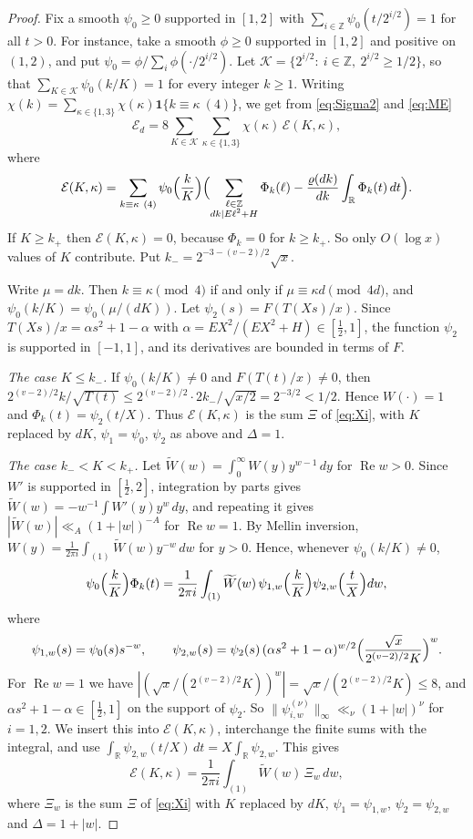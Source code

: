 \documentclass[11pt]{amsart}
\theoremstyle{remark}
\theoremstyle{definition}
\numberwithin{equation}{section}
\newcommand{\Z}{\mathbb{Z}}
\newcommand{\R}{\mathbb{R}}
\newcommand{\one}{\mathbf{1}}
\begin{document}
\begin{proof}
Fix a smooth $\psi_0\ge0$ supported in $[1,2]$ with $\sum_{i\in\Z}\psi_0(t/2^{i/2})=1$ for all $t>0$. For instance, take a smooth $\phi\ge0$ supported in $[1,2]$ and positive on $(1,2)$, and put $\psi_0=\phi/\sum_i\phi(\cdot/2^{i/2})$. Let $\mathcal K=\{2^{i/2}:\ i\in\Z,\ 2^{i/2}\ge1/2\}$, so that $\sum_{K\in\mathcal K}\psi_0(k/K)=1$ for every integer $k\ge1$. Writing $\chi(k)=\sum_{\kappa\in\{1,3\}}\chi(\kappa)\one\{k\equiv\kappa\ (4)\}$, we get from \eqref{eq:Sigma2} and \eqref{eq:ME}
\[
\mathcal E_d=8\sum_{K\in\mathcal K}\sum_{\kappa\in\{1,3\}}\chi(\kappa)\,\mathcal E(K,\kappa),
\]
where
\[
\mathcal E(K,\kappa)=\sum_{k\equiv\kappa\ (4)}\psi_0\Bigl(\frac kK\Bigr)\Bigl(\sum_{\substack{\ell\in\Z\\ dk\mid E\ell^2+H}}\Phi_k(\ell)-\frac{\varrho(dk)}{dk}\int_\R\Phi_k(t)\,dt\Bigr).
\]
If $K\ge k_+$ then $\mathcal E(K,\kappa)=0$, because $\Phi_k=0$ for $k\ge k_+$. So only $O(\log x)$ values of $K$ contribute. Put $k_-=2^{-3-(v-2)/2}\sqrt x$.

Write $\mu=dk$. Then $k\equiv\kappa\pmod 4$ if and only if $\mu\equiv\kappa d\pmod{4d}$, and $\psi_0(k/K)=\psi_0(\mu/(dK))$. Let $\psi_2(s)=F(T(Xs)/x)$. Since $T(Xs)/x=\alpha s^2+1-\alpha$ with $\alpha=EX^2/(EX^2+H)\in[\frac12,1]$, the function $\psi_2$ is supported in $[-1,1]$, and its derivatives are bounded in terms of $F$.

\emph{The case $K\le k_-$.} If $\psi_0(k/K)\ne0$ and $F(T(t)/x)\ne0$, then $2^{(v-2)/2}k/\sqrt{T(t)}\le2^{(v-2)/2}\cdot2k_-/\sqrt{x/2}=2^{-3/2}<1/2$. Hence $W(\cdot)=1$ and $\Phi_k(t)=\psi_2(t/X)$. Thus $\mathcal E(K,\kappa)$ is the sum $\Xi$ of \eqref{eq:Xi}, with $K$ replaced by $dK$, $\psi_1=\psi_0$, $\psi_2$ as above and $\Delta=1$.

\emph{The case $k_-<K<k_+$.} Let $\widetilde W(w)=\int_0^\infty W(y)y^{w-1}\,dy$ for $\operatorname{Re}w>0$. Since $W'$ is supported in $[\frac12,2]$, integration by parts gives $\widetilde W(w)=-w^{-1}\int W'(y)y^{w}\,dy$, and repeating it gives $|\widetilde W(w)|\ll_A(1+|w|)^{-A}$ for $\operatorname{Re}w=1$. By Mellin inversion, $W(y)=\frac1{2\pi i}\int_{(1)}\widetilde W(w)y^{-w}\,dw$ for $y>0$. Hence, whenever $\psi_0(k/K)\ne0$,
\[
\psi_0\Bigl(\frac kK\Bigr)\Phi_k(t)=\frac1{2\pi i}\int_{(1)}\widetilde W(w)\,\psi_{1,w}\Bigl(\frac kK\Bigr)\psi_{2,w}\Bigl(\frac tX\Bigr)dw,
\]
where
\[
\psi_{1,w}(s)=\psi_0(s)s^{-w},\qquad\psi_{2,w}(s)=\psi_2(s)\,(\alpha s^2+1-\alpha)^{w/2}\Bigl(\frac{\sqrt x}{2^{(v-2)/2}K}\Bigr)^{w}.
\]
For $\operatorname{Re}w=1$ we have $|(\sqrt x/(2^{(v-2)/2}K))^w|=\sqrt x/(2^{(v-2)/2}K)\le8$, and $\alpha s^2+1-\alpha\in[\frac12,1]$ on the support of $\psi_2$. So $\|\psi_{i,w}^{(\nu)}\|_\infty\ll_\nu(1+|w|)^\nu$ for $i=1,2$. We insert this into $\mathcal E(K,\kappa)$, interchange the finite sums with the integral, and use $\int_\R\psi_{2,w}(t/X)\,dt=X\int_\R\psi_{2,w}$. This gives
\[
\mathcal E(K,\kappa)=\frac1{2\pi i}\int_{(1)}\widetilde W(w)\,\Xi_w\,dw,
\]
where $\Xi_w$ is the sum $\Xi$ of \eqref{eq:Xi} with $K$ replaced by $dK$, $\psi_1=\psi_{1,w}$, $\psi_2=\psi_{2,w}$ and $\Delta=1+|w|$.


\end{proof}
\end{document}
